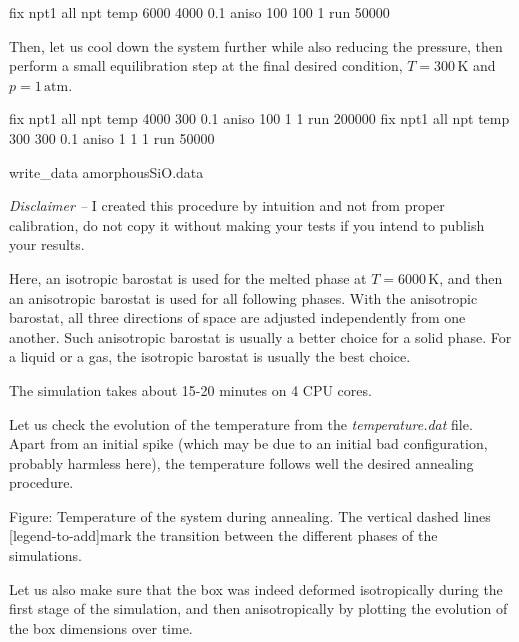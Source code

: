 \begin{lcverbatim}
fix npt1 all npt temp 6000 4000 0.1 aniso 100 100 1
run 50000
\end{lcverbatim}

\noindent Then, let us cool down the system
further while also reducing the pressure, then perform a
small equilibration step at the final desired condition, $T = 300\,\text{K}$
and $p = 1\,\text{atm}$.

\begin{lcverbatim}
fix npt1 all npt temp 4000 300 0.1 aniso 100 1 1
run 200000
fix npt1 all npt temp 300 300 0.1 aniso 1 1 1
run 50000

write_data amorphousSiO.data
\end{lcverbatim}

\noindent \textit{Disclaimer --} I created this procedure by intuition and
not from proper calibration, do not copy it without
making your tests if you intend to publish your results.

\begin{tcolorbox}[colback=mylightblue!5!white,colframe=mylightblue!75!black,title=Anisotropic versus isotropic barostat]

\vspace{0.25cm} \noindent Here, an isotropic barostat is used for the melted phase at $T = 6000\,\text{K}$,
and then an anisotropic barostat is used for all following phases. With the anisotropic 
barostat, all three directions of space are adjusted independently from one another. Such
anisotropic barostat is usually a better choice for a solid phase. For a
liquid or a gas, the isotropic barostat is usually the best choice.
\end{tcolorbox}

\noindent The simulation takes about 15-20 minutes on 4 CPU cores.

\vspace{0.25cm} \noindent Let us check the evolution of the temperature from the \textit{temperature.dat} file.
Apart from an initial spike (which may be due to an initial
bad configuration, probably harmless here),
the temperature follows well the desired annealing procedure.

\vspace{0.25cm} Figure: Temperature of the system during annealing. The vertical dashed lines
[legend-to-add]mark the transition between the different phases of the simulations.

\vspace{0.25cm} \noindent Let us also make sure that the box was indeed deformed isotropically during the first 
stage of the simulation, and then anisotropically by plotting the evolution of the
box dimensions over time.

